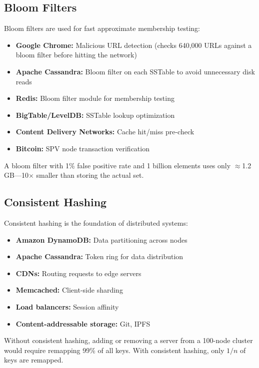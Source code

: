 \subsection{Bloom Filters}

Bloom filters are used for fast approximate membership testing:
\begin{itemize}
    \item \textbf{Google Chrome:} Malicious URL detection (checks 640,000 URLs against a bloom filter before hitting the network)
    \item \textbf{Apache Cassandra:} Bloom filter on each SSTable to avoid unnecessary disk reads
    \item \textbf{Redis:} Bloom filter module for membership testing
    \item \textbf{BigTable/LevelDB:} SSTable lookup optimization
    \item \textbf{Content Delivery Networks:} Cache hit/miss pre-check
    \item \textbf{Bitcoin:} SPV node transaction verification
\end{itemize}

A bloom filter with 1\% false positive rate and 1 billion elements uses only $\approx$1.2 GB---10$\times$ smaller than storing the actual set.

\subsection{Consistent Hashing}

Consistent hashing is the foundation of distributed systems:
\begin{itemize}
    \item \textbf{Amazon DynamoDB:} Data partitioning across nodes
    \item \textbf{Apache Cassandra:} Token ring for data distribution
    \item \textbf{CDNs:} Routing requests to edge servers
    \item \textbf{Memcached:} Client-side sharding
    \item \textbf{Load balancers:} Session affinity
    \item \textbf{Content-addressable storage:} Git, IPFS
\end{itemize}

Without consistent hashing, adding or removing a server from a 100-node cluster would require remapping 99\% of all keys. With consistent hashing, only $1/n$ of keys are remapped.

